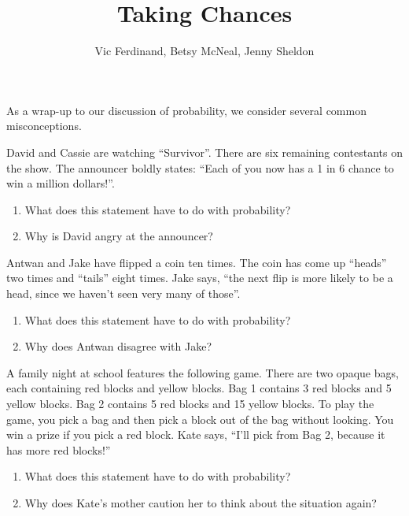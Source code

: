 \documentclass{ximera}
\title{Taking Chances}
\author{Vic Ferdinand, Betsy McNeal, Jenny Sheldon}
\begin{document}
\begin{abstract}
\end{abstract}
\maketitle

\begin{instructorIntro}
As a wrap-up to our discussion of probability, we consider several common misconceptions.
\end{instructorIntro}

\begin{problem}
David and Cassie are watching ``Survivor''.  There are six remaining contestants on the show.  The announcer boldly states: ``Each of you now has a 1 in 6 chance to win a million dollars!''.

\begin{enumerate}
\item What does this statement have to do with probability?
\item Why is David angry at the announcer?
\end{enumerate}
\end{problem}

\begin{problem}
Antwan and Jake have flipped a coin ten times.  The coin has come up ``heads'' two times and ``tails'' eight times.  Jake says, ``the next flip is more likely to be a head, since we haven't seen very many of those''.
\begin{enumerate}
\item What does this statement have to do with probability?
\item Why does Antwan disagree with Jake?
\end{enumerate}
\end{problem}

\begin{problem}
A family night at school features the following game.  There are two opaque bags, each containing red blocks and yellow blocks.  Bag 1 contains 3 red blocks and 5 yellow blocks.  Bag 2 contains 5 red blocks and 15 yellow blocks.  To play the game, you pick a bag and then pick a block out of the bag without looking.  You win a prize if you pick a red block.  Kate says, ``I'll pick from Bag 2, because it has more red blocks!''
\begin{enumerate}
\item What does this statement have to do with probability?
\item Why does Kate's mother caution her to think about the situation again?
\end{enumerate}
\end{problem}
\end{document}
